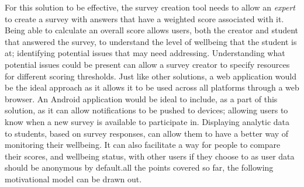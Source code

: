 For this solution to be effective, the survey creation tool needs to allow an \emph{expert} to create a survey with answers that have a weighted score associated with it. 
Being able to calculate an overall score allows users, both the creator and student that answered the survey, to understand the level of 
wellbeing that the student is at; identifying potential issues that may need addressing.
Understanding what potential issues could be present can allow a survey creator to specify resources for different scoring thresholds.
Just like other solutions, a web application would be the ideal approach as it allows it to be used across all platforms through a web
browser.
An Android application would be ideal to include, as a part of this solution, as it can allow notifications to be pushed to devices; allowing
users to know when a new survey is available to participate in.
Displaying analytic data to students, based on survey responses, can allow them to have a better way of monitoring their wellbeing.
It can also facilitate a way for people to compare their scores, and wellbeing status, with other users if they choose to as user data should be
anonymous by default.all the points covered so far, the following motivational model can be drawn out.
